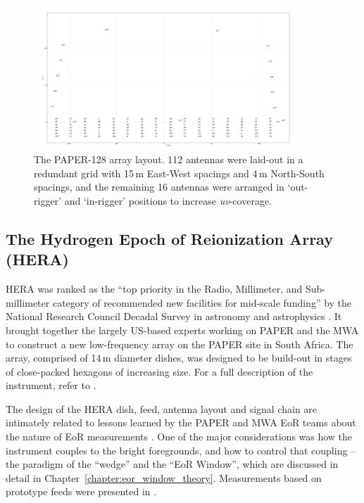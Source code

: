 \begin{figure}
\centering
\includegraphics[width=0.9\textwidth]{chapters/instruments/figures/antlayout_psa128.png}
\caption[The PAPER-128 array layout.]{The PAPER-128 array layout. 112 antennas were laid-out in a redundant grid with 15\,m East-West spacings and 4\,m North-South spacings, and the remaining 16 antennas were arranged in `out-rigger' and `in-rigger' positions to increase \textit{uv}-coverage.}
\label{fig:instruments_psa128}
\end{figure}

\subsection{The Hydrogen Epoch of Reionization Array (HERA)}
\label{subsec:hera_instrument}

HERA was ranked as the ``top priority in the Radio, Millimeter, and Sub-millimeter category of recommended new facilities for mid-scale funding'' by the National Research Council Decadal Survey in astronomy and astrophysics \citep{Astro2010}. It brought together the largely US-based experts working on PAPER and the MWA to construct a new low-frequency array on the PAPER site in South Africa. The array, comprised of 14\,m diameter dishes, was designed to be build-out in stages of close-packed hexagons of increasing size. For a full description of the instrument, refer to \cite{deBoer.17}.

The design of the HERA dish, feed, antenna layout and signal chain are intimately related to lessons learned by the PAPER and MWA EoR teams about the nature of EoR measurements \citep[e.g.][]{Nithya.15a}. One of the major considerations was how the instrument couples to the bright foregrounds, and how to control that coupling -- the paradigm of the ``wedge'' and the ``EoR Window'', which are discussed in detail in Chapter~\ref{chapter:eor_window_theory}. Measurements based on prototype feeds were presented in \cite[][Patra et al. \textit{submitted}]{Ewall-Wice.16.HERA_Dish, Neben.16}.

